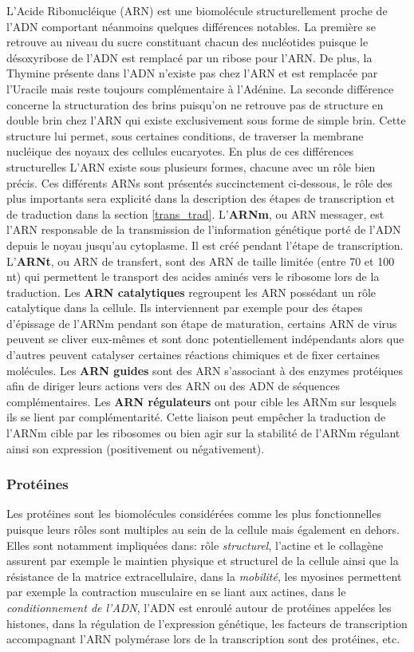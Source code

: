 L'Acide Ribonucléique (ARN) est une biomolécule structurellement proche de l'ADN comportant néanmoins quelques différences notables. La première se retrouve au niveau du sucre constituant chacun des nucléotides puisque le désoxyribose de l'ADN est remplacé par un ribose pour l'ARN. De plus, la Thymine présente dans l'ADN n'existe pas chez l'ARN et est remplacée par l'Uracile mais reste toujours complémentaire à l'Adénine. La seconde différence concerne la structuration des brins puisqu'on ne retrouve pas de structure en double brin chez l'ARN qui existe exclusivement sous forme de simple brin. Cette structure lui permet, sous certaines conditions, de traverser la membrane nucléique des noyaux des cellules eucaryotes.
En plus de ces différences structurelles L'ARN existe sous plusieurs formes, chacune avec un rôle bien précis. Ces différents ARNs sont présentés succinctement ci-dessous, le rôle des plus importants sera explicité dans la description des étapes de transcription et de traduction dans la section \ref{trans_trad}.
L'\textbf{ARNm}, ou ARN messager, est l'ARN responsable de la transmission de l'information génétique porté de l'ADN depuis le noyau jusqu'au cytoplasme. Il est créé pendant l’étape de transcription.
L'\textbf{ARNt}, ou ARN de transfert, sont des ARN de taille limitée (entre 70 et 100 nt) qui permettent le transport des acides aminés vers le ribosome lors de la traduction.
Les \textbf{ARN catalytiques} regroupent les ARN possédant un rôle catalytique dans la cellule. Ils interviennent par exemple pour des étapes d'épissage de l'ARNm pendant son étape de maturation, certains ARN de virus peuvent se cliver eux-mêmes et sont donc potentiellement indépendants alors que d'autres peuvent catalyser certaines réactions chimiques et de fixer certaines molécules.
Les \textbf{ARN guides} sont des ARN s'associant à des enzymes protéiques afin de diriger leurs actions vers des ARN ou des ADN de séquences complémentaires.
Les \textbf{ARN régulateurs} ont pour cible les ARNm sur lesquels ils se lient par complémentarité. Cette liaison peut empêcher la traduction de l'ARNm cible par les ribosomes ou bien agir sur la stabilité de l'ARNm régulant ainsi son expression (positivement ou négativement).

\subsubsection{Protéines}

Les protéines sont les biomolécules considérées comme les plus fonctionnelles puisque leurs rôles sont multiples au sein de la cellule mais également en dehors. Elles sont notamment impliquées dans: rôle \textit{structurel}, l'actine et le collagène assurent par exemple le maintien physique et structurel de la cellule ainsi que la résistance de la matrice extracellulaire, dans la \textit{mobilité}, les myosines permettent par exemple la contraction musculaire en se liant aux actines, dans le \textit{conditionnement de l'ADN}, l'ADN est enroulé autour de protéines appelées les histones, dans la régulation de l'expression génétique, les facteurs de transcription accompagnant l'ARN polymérase lors de la transcription sont des protéines, etc.

